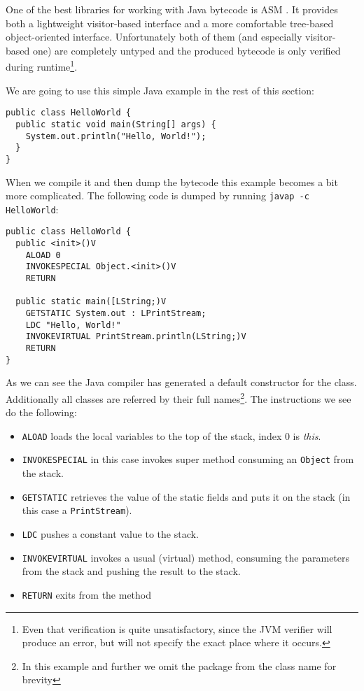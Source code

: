 \documentclass{sig-alternate}
\begin{document}
One of the best libraries for working with Java bytecode is ASM \cite{bruneton2002acm}. It provides both a lightweight visitor-based interface and a more comfortable tree-based object-oriented interface. Unfortunately both of them (and especially visitor-based one) are completely untyped and the produced bytecode is only verified during runtime\footnote{Even that verification is quite unsatisfactory, since the JVM verifier will produce an error, but will not specify the exact place where it occurs.}.

We are going to use this simple Java example in the rest of this section:

\begin{verbatim}
public class HelloWorld {
  public static void main(String[] args) {
    System.out.println("Hello, World!");
  }
}
\end{verbatim}

When we compile it and then dump the bytecode this example becomes a bit more complicated. The following code is dumped by running \verb!javap -c HelloWorld!:

\begin{verbatim}
public class HelloWorld {
  public <init>()V
    ALOAD 0
    INVOKESPECIAL Object.<init>()V
    RETURN
  
  public static main([LString;)V
    GETSTATIC System.out : LPrintStream;
    LDC "Hello, World!"
    INVOKEVIRTUAL PrintStream.println(LString;)V
    RETURN
}
\end{verbatim}

As we can see the Java compiler has generated a default constructor for the class. Additionally all classes are referred by their full names\footnote{In this example and further we omit the package from the class name for brevity}. The instructions we see do the following:
\begin{itemize}
\item \verb!ALOAD! loads the local variables to the top of the stack, index $0$ is \emph{this}.
\item \verb!INVOKESPECIAL! in this case invokes super method consuming an \verb!Object! from the stack.
\item \verb!GETSTATIC! retrieves the value of the static fields and puts it on the stack (in this case a \verb!PrintStream!).
\item \verb!LDC! pushes a constant value to the stack.
\item \verb!INVOKEVIRTUAL! invokes a usual (virtual) method, consuming the parameters from the stack and pushing the result to the stack.
\item \verb!RETURN! exits from the method
\end{itemize}
\end{document}
